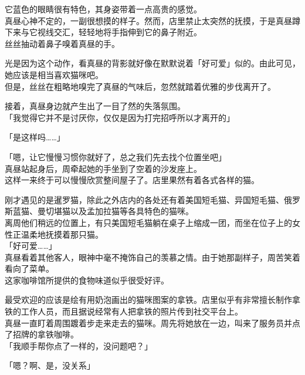 它蓝色的眼睛很有特色，其身姿带着一点高贵的感觉。\\

真昼心神不定的，一副很想摸的样子。然而，店里禁止太突然的抚摸，于是真昼蹲下来与它视线交汇，轻轻地将手指伸到它的鼻子附近。\\

丝丝抽动着鼻子嗅着真昼的手。

光是因为这个动作，看真昼的背影就好像在默默说着「好可爱」似的。由此可见，她应该是相当喜欢猫咪吧。\\

但是，丝丝在粗略地嗅完了真昼的气味后，忽然就踏着优雅的步伐离开了。

接着，真昼身边就产生出了一目了然的失落氛围。\\

「我觉得它并不是讨厌你，仅仅是因为打完招呼所以才离开的」

「是这样吗……」

「嗯，让它慢慢习惯你就好了，总之我们先去找个位置坐吧」\\

真昼站起身后，周牵起她的手坐到了空着的沙发座上。\\

这样一来终于可以慢慢欣赏整间屋子了。店里果然有着各式各样的猫。

刚才遇见的是暹罗猫，除此之外店内的各处还有着美国短毛猫、异国短毛猫、俄罗斯蓝猫、曼切堪猫以及孟加拉猫等各具特色的猫咪。\\

离周他们稍远的位置上，有只美国短毛猫躺在桌子上缩成一团，而坐在位子上的女性正温柔地抚摸着那只猫。\\

「好可爱……」\\

真昼看着其他客人，眼神中毫不掩饰自己的羡慕之情。由于她那副样子，周苦笑着看向了菜单。\\

这家咖啡馆所提供的食物味道似乎很受好评。

最受欢迎的应该是绘有用奶泡画出的猫咪图案的拿铁。店里似乎有非常擅长制作拿铁的工作人员，而且据说经常有人把拿铁的照片传到社交平台上。\\

真昼一直盯着周围踱着步走来走去的猫咪。周先将她放在一边，叫来了服务员并点了招牌的拿铁咖啡。\\

「我顺手帮你点了一样的，没问题吧？」

「嗯？啊、是，没关系」\\

